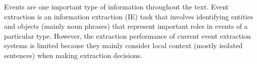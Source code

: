 

Events are one important type of information throughout the text. 
Event extraction 
is an information extraction (IE)
task that involves identifying 
entities and objects (mainly noun phrases) that represent 
important roles in
events 
of a particular type.
However, the extraction performance of current event extraction systems 
is limited because they mainly consider local context 
(mostly isolated sentences) when making extraction decisions. 



